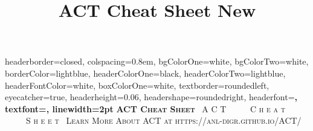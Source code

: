 \documentclass[potrait, z1paper, fontscale=0.33]{baposter} %
\title{ACT Cheat Sheet New}
\begin{document}
\begin{poster}
{
headerborder=closed, %
colspacing=0.8em, %
bgColorOne=white, %
bgColorTwo=white, %
borderColor=lightblue, %
headerColorOne=black, %
headerColorTwo=lightblue, %
headerFontColor=white, %
boxColorOne=white, %
textborder=roundedleft, %
eyecatcher=true, %
headerheight=0.06\textheight, %
headershape=roundedright, %
headerfont=\Large\bf\textsc, %
textfont={\setlength{\parindent}{1.5em}}, %
linewidth=2pt %
}
{\bf\textsc{ACT Cheat Sheet}\vspace{0.5em}} %
{\textsc{\ A C T \ \ \ \ \ C h e a t \ \ \ \ \ S h e e t\ \hspace{12pt}}}
{\textsc{Learn More About ACT at https://anl-digr.github.io/ACT/ \hspace{12pt}}} 



\end{poster}
\end{document}
